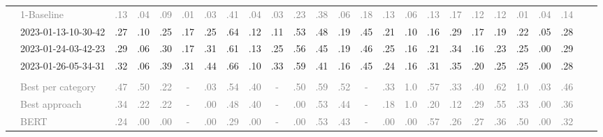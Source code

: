 \begin{table*}
\begin{tabular}{@{}ll@{\hspace{10pt}}c@{\hspace{5pt}}cccccccccccccccccccccc@{}}
& \textcolor{gray}{1-Baseline} & \textcolor{gray}{.13} & \textcolor{gray}{.04} & \textcolor{gray}{.09} & \textcolor{gray}{.01} & \textcolor{gray}{.03} & \textcolor{gray}{.41} & \textcolor{gray}{.04} & \textcolor{gray}{.03} & \textcolor{gray}{.23} & \textcolor{gray}{.38} & \textcolor{gray}{.06} & \textcolor{gray}{.18} & \textcolor{gray}{.13} & \textcolor{gray}{.06} & \textcolor{gray}{.13} & \textcolor{gray}{.17} & \textcolor{gray}{.12} & \textcolor{gray}{.12} & \textcolor{gray}{.01} & \textcolor{gray}{.04} & \textcolor{gray}{.14} \\
& 2023-01-13-10-30-42 & .27 & .10 & .25 & .17 & .25 & .64 & .12 & .11 & .53 & .48 & .19 & .45 & .21 & .10 & .16 & .29 & .17 & .19 & .22 & .05 & .28 \\
& 2023-01-24-03-42-23 & .29 & .06 & .30 & .17 & .31 & .61 & .13 & .25 & .56 & .45 & .19 & .46 & .25 & .16 & .21 & .34 & .16 & .23 & .25 & .00 & .29 \\
& 2023-01-26-05-34-31 & .32 & .06 & .39 & .31 & .44 & .66 & .10 & .33 & .59 & .41 & .16 & .45 & .24 & .16 & .31 & .35 & .20 & .25 & .25 & .00 & .28 \\
\addlinespace
\multicolumn{2}{@{}l}{\emph{New York Times}} \\
& \textcolor{gray}{Best per category} & \textcolor{gray}{.47} & \textcolor{gray}{.50} & \textcolor{gray}{.22} & \textcolor{gray}{-} & \textcolor{gray}{.03} & \textcolor{gray}{.54} & \textcolor{gray}{.40} & \textcolor{gray}{-} & \textcolor{gray}{.50} & \textcolor{gray}{.59} & \textcolor{gray}{.52} & \textcolor{gray}{-} & \textcolor{gray}{.33} & \textcolor{gray}{1.0} & \textcolor{gray}{.57} & \textcolor{gray}{.33} & \textcolor{gray}{.40} & \textcolor{gray}{.62} & \textcolor{gray}{1.0} & \textcolor{gray}{.03} & \textcolor{gray}{.46} \\
& \textcolor{gray}{Best approach} & \textcolor{gray}{.34} & \textcolor{gray}{.22} & \textcolor{gray}{.22} & \textcolor{gray}{-} & \textcolor{gray}{.00} & \textcolor{gray}{.48} & \textcolor{gray}{.40} & \textcolor{gray}{-} & \textcolor{gray}{.00} & \textcolor{gray}{.53} & \textcolor{gray}{.44} & \textcolor{gray}{-} & \textcolor{gray}{.18} & \textcolor{gray}{1.0} & \textcolor{gray}{.20} & \textcolor{gray}{.12} & \textcolor{gray}{.29} & \textcolor{gray}{.55} & \textcolor{gray}{.33} & \textcolor{gray}{.00} & \textcolor{gray}{.36} \\
& \textcolor{gray}{BERT} & \textcolor{gray}{.24} & \textcolor{gray}{.00} & \textcolor{gray}{.00} & \textcolor{gray}{-} & \textcolor{gray}{.00} & \textcolor{gray}{.29} & \textcolor{gray}{.00} & \textcolor{gray}{-} & \textcolor{gray}{.00} & \textcolor{gray}{.53} & \textcolor{gray}{.43} & \textcolor{gray}{-} & \textcolor{gray}{.00} & \textcolor{gray}{.00} & \textcolor{gray}{.57} & \textcolor{gray}{.26} & \textcolor{gray}{.27} & \textcolor{gray}{.36} & \textcolor{gray}{.50} & \textcolor{gray}{.00} & \textcolor{gray}{.32} \\

\end{tabular}
\end{table*}
